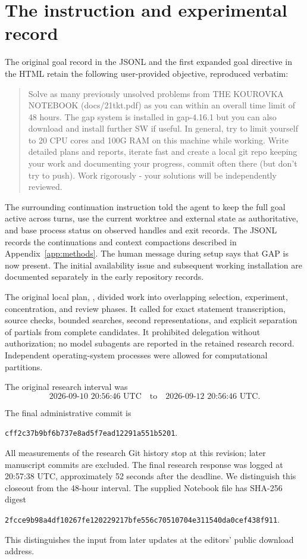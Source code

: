 \section{The instruction and experimental record}
\label{app:protocol}

The original goal record in the JSONL and the first expanded goal
directive in the HTML retain the following user-provided objective,
reproduced verbatim:

\begin{quote}\small
Solve as many previously unsolved problems from THE KOUROVKA
NOTEBOOK (docs/21tkt.pdf) as you can within an overall time limit
of 48 hours. The gap system is installed in gap-4.16.1 but you
can also download and install further SW if useful. In general,
try to limit yourself to 20 CPU cores and 100G RAM on this
machine while working. Write detailed plans and reports,
iterate fast and create a local git repo keeping your work
and documenting your progress, commit often there (but don't
try to push). Work rigorously - your solutions will be
independently reviewed.
\end{quote}

The surrounding continuation instruction told the agent to
keep the full goal active across turns, use the current
worktree and external state as authoritative, and base
process status on observed handles and exit records.
The JSONL records the continuations and context compactions described
in Appendix~\ref{app:methods}. The human message during setup says
that GAP is now present.
The initial availability issue and subsequent working
installation are documented separately in the early
repository records.

The original local plan,
, divided work into overlapping
selection, experiment, concentration, and review phases.
It called for exact statement transcription, source checks,
bounded searches, second representations, and explicit
separation of partials from complete candidates. It
prohibited delegation without authorization; no model
subagents are reported in the retained research record.
Independent operating-system processes were allowed for
computational partitions.

The original research interval was
\[
 \text{2026-09-10 20:56:46 UTC}\quad\text{to}\quad
 \text{2026-09-12 20:56:46 UTC}.
\]
\begin{samepage}
The final administrative commit is
\begin{center}\small
\nolinkurl{cff2c37b9bf6b737e8ad5f7ead12291a551b5201}.
\end{center}
\end{samepage}
All measurements of the research Git history stop at this
revision; later manuscript commits are excluded. The final research
response was logged at 20:57:38 UTC, approximately 52 seconds after
the deadline. We distinguish this closeout from the 48-hour interval.
The supplied Notebook file has SHA-256 digest
\begin{center}\small
\nolinkurl{2fcce9b98a4df10267fe120229217bfe556c70510704e311540da0cef438f911}.
\end{center}
This distinguishes the input from later updates at the
editors' public download address.

